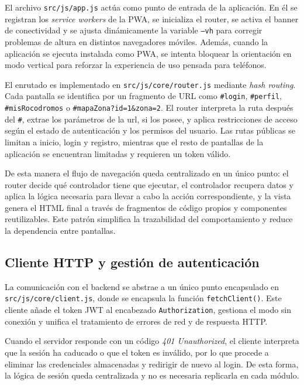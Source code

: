 El archivo \texttt{src/js/app.js} actúa como punto de entrada de la aplicación. En él se registran los \textit{service workers} de la PWA, se inicializa el router, se activa el banner de conectividad y se ajusta dinámicamente la variable \texttt{--vh} para corregir problemas de altura en distintos navegadores móviles. Además, cuando la aplicación se ejecuta instalada como PWA, se intenta bloquear la orientación en modo vertical para reforzar la experiencia de uso pensada para teléfonos.

El enrutado es implementado en \texttt{src/js/core/router.js} mediante \textit{hash routing}. Cada pantalla se identifica por un fragmento de URL como \texttt{\#login}, \texttt{\#perfil}, \texttt{\#misRocodromos} o \texttt{\#mapaZona?id=1\&zona=2}. El router interpreta la ruta después del \texttt{\#}, extrae los parámetros de la url, si los posee, y aplica restricciones de acceso según el estado de autenticación y los permisos del usuario. Las rutas públicas se limitan a inicio, login y registro, mientras que el resto de pantallas de la aplicación se encuentran limitadas y requieren un token válido.

De esta manera el flujo de navegación queda centralizado en un único punto: el router decide qué controlador tiene que ejecutar, el controlador recupera datos y aplica la lógica necesaria para llevar a cabo la acción correspondiente, y la vista genera el HTML final a través de fragmentos de código propios y componentes reutilizables. Este patrón simplifica la trazabilidad del comportamiento y reduce la dependencia entre pantallas.

\subsection{Cliente HTTP y gestión de autenticación}

La comunicación con el backend se abstrae a un único punto encapsulado en \texttt{src/js/core/client.js}, donde se encapsula la función \texttt{fetchClient()}. Este cliente añade el token JWT al encabezado \texttt{Authorization}, gestiona el modo sin conexión y unifica el tratamiento de errores de red y de respuesta HTTP.

Cuando el servidor responde con un código \textit{401 Unauthorized}, el cliente interpreta que la sesión ha caducado o que el token es inválido, por lo que procede a eliminar las credenciales almacenadas y redirigir de nuevo al login. De esta forma, la lógica de sesión queda centralizada y no es necesaria replicarla en cada módulo.

